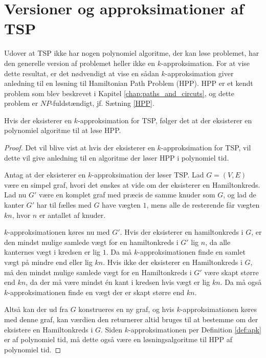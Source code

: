 \section{Versioner og approksimationer af TSP}
Udover at TSP ikke har nogen polynomiel algoritme, der kan løse problemet, har den generelle version af problemet heller ikke en $k$-approksimation.
For at vise dette resultat, er det nødvendigt at vise en sådan $k$-approksimation giver anledning til en løsning til Hamiltonian Path Problem (HPP).
HPP er et kendt problem som blev beskrevet i Kapitel \ref{chap:paths_and_circuts}, og dette problem er $NP$-fuldstændigt, jf. Sætning \ref{HPP}.

\begin{thm} \label{thm:TSP_HPP}
	Hvis der eksisterer en $k$-approksimation for TSP, følger det at der eksisterer en polynomiel algoritme til at løse HPP. 
\end{thm}

\begin{proof}
	Det vil blive vist at hvis der eksisterer en $k$-approksimation for TSP, vil dette vil give anledning til en algoritme der løser HPP i polynomiel tid.

	Antag at der eksisterer en $k$-approksimation der løser TSP.
	Lad $G=(V,E)$ være en simpel graf, hvori det ønskes at vide om der eksisterer en Hamiltonkreds.
	Lad nu $G'$ være en komplet graf med præcis de samme knuder som $G$, og lad de kanter $G'$ har til fælles med $G$ have vægten $1$, mens alle de resterende får vægten $kn$, hvor $n$ er antallet af knuder.

	$k$-approksimationen køres nu med $G'$.
	Hvis der eksisterer en hamiltonkreds i $G$, er den mindst mulige samlede vægt for en hamiltonkreds i $G'$ lig $n$, da alle kanternes vægt i kredsen er lig $1$.
	Da må $k$-approksimationen finde en samlet vægt på mindre end eller lig $kn$.
	Hvis ikke der eksisterer en Hamiltonkreds i $G$, må den mindst mulige samlede vægt for en Hamiltonkreds i $G'$ være skapt større end $kn$, da der må være mindst én kant i kredsen hvis vægt er lig $kn$.
	Da må også $k$-approksimationen finde en vægt der er skapt større end $kn$.

	Altså kan der ud fra $G$ konstrueres en ny graf, og hvis $k$-approksimationen køres med denne graf, kan værdien den returnerer altid bruges til at bestemme om der eksistere en Hamiltonkreds i $G$.
	Siden $k$-approksimationen per Definition \ref{def:apk} er af polynomiel tid, må dette også være en løsningsalgoritme til HPP af polynomiel tid.
\end{proof}

